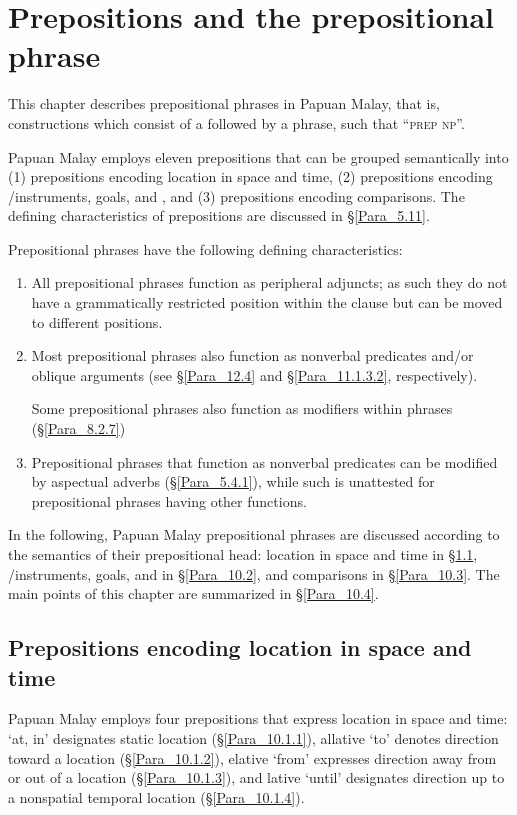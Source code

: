 \chapter[Prepositions and the prepositional phrase]{Prepositions and the prepositional phrase}
\label{Para_10}
This chapter describes prepositional phrases in Papuan Malay, that is, constructions which consist of a  followed by a  phrase, such that ``\textsc{prep} \textsc{np}''.



Papuan Malay employs eleven prepositions that can be grouped semantically into (1) prepositions encoding location in space and time, (2) prepositions encoding /instruments, goals, and , and (3) prepositions encoding comparisons. The defining characteristics of prepositions are discussed in §\ref{Para_5.11}.



Prepositional phrases have the following defining characteristics:


\begin{enumerate}
\item 
All prepositional phrases function as peripheral adjuncts; as such they do not have a grammatically restricted position within the clause but can be moved to different positions.
\item Most prepositional phrases also function as nonverbal predicates and/\-or oblique arguments (see §\ref{Para_12.4} and §\ref{Para_11.1.3.2}, respectively).

Some prepositional phrases also function as modifiers within  phrases (§\ref{Para_8.2.7})

\item 
Prepositional phrases that function as nonverbal predicates can be modified by aspectual adverbs (§\ref{Para_5.4.1}), while such  is unattested for prepositional phrases having other functions.

\end{enumerate}

In the following, Papuan Malay prepositional phrases are discussed according to the semantics of their prepositional head: location in space and time in §\ref{Para_10.1}, /instruments, goals, and  in §\ref{Para_10.2}, and comparisons in §\ref{Para_10.3}. The main points of this chapter are summarized in §\ref{Para_10.4}.


\section{Prepositions encoding location in space and time}
\label{Para_10.1}
Papuan Malay employs four prepositions that express location in space and time:   ‘at, in’ designates static location (§\ref{Para_10.1.1}), allative  ‘to’ denotes direction toward a location (§\ref{Para_10.1.2}), elative  ‘from’ expresses direction away from or out of a location (§\ref{Para_10.1.3}), and lative  ‘until’ designates direction up to a nonspatial temporal location (§\ref{Para_10.1.4}).


